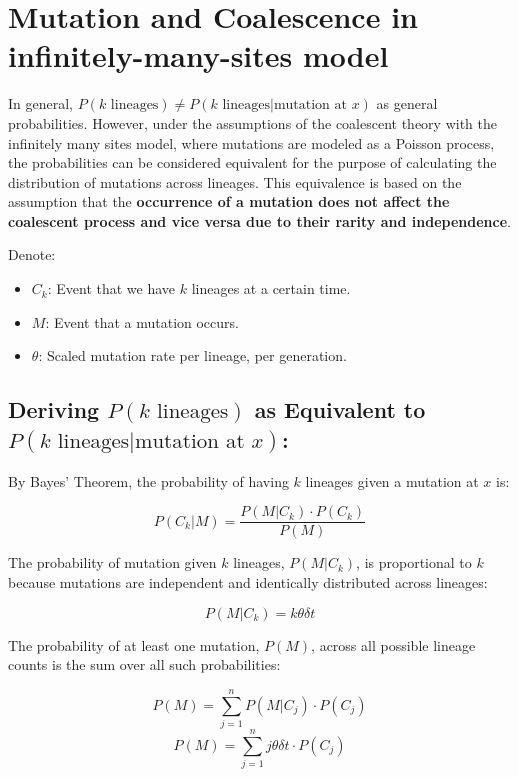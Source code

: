 \documentclass{article}
\begin{document}
\section{Mutation and Coalescence in infinitely-many-sites model}

In general, \( P(k \text{ lineages}) \neq P(k \text{ lineages} | \text{mutation at } x) \) as general probabilities. However, under the assumptions of the coalescent theory with the infinitely many sites model, where mutations are modeled as a Poisson process, the probabilities can be considered equivalent for the purpose of calculating the distribution of mutations across lineages. This equivalence is based on the assumption that the \textbf{occurrence of a mutation does not affect the coalescent process and vice versa due to their rarity and independence}.

Denote:
\begin{itemize}
    \item \( C_k \): Event that we have \( k \) lineages at a certain time.
    \item \( M \): Event that a mutation occurs.
    \item \( \theta \): Scaled mutation rate per lineage, per generation.

\end{itemize}





\subsection{Deriving \( P(k \text{ lineages}) \) as Equivalent to \( P(k \text{ lineages} | \text{mutation at } x) \):}

By Bayes' Theorem, the probability of having \( k \) lineages given a mutation at \( x \) is:

\[ P(C_k | M) = \frac{P(M | C_k) \cdot P(C_k)}{P(M)} \]

The probability of mutation given \( k \) lineages, \( P(M | C_k) \), is proportional to \( k \) because mutations are independent and identically distributed across lineages:

\[ P(M | C_k) = k \theta \delta t \]

The probability of at least one mutation, \( P(M) \), across all possible lineage counts is the sum over all such probabilities:

\[ P(M) = \sum_{j=1}^{n} P(M | C_j) \cdot P(C_j) \]
\[ P(M) = \sum_{j=1}^{n} j \theta \delta t \cdot P(C_j) \]
\end{document}

